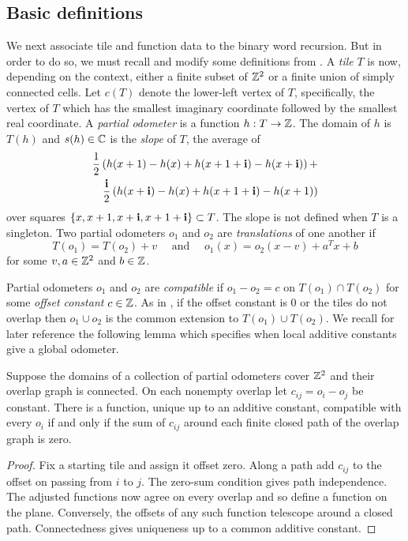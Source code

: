 \documentclass[12pt]{amsart}
\begin{document}
\subsection{Basic definitions} \label{subsec:basic_definitions}
We next associate tile and function data to the binary word recursion. But in order to do so, we must recall and modify
some definitions from \cite{levine2017apollonian}. A {\it tile} $T$ is now, depending on the context, either a finite subset of $\mathbb{Z}^2$ or a finite union of simply connected cells. Let $c(T)$ denote 
the lower-left vertex of $T$, specifically, the vertex of $T$ which has the smallest imaginary coordinate followed by the smallest real coordinate. A {\it partial odometer} is a function $h:T \to \mathbb{Z}$. The domain of $h$ is $T(h)$ and $s(h) \in \mathbb{C}$ is the {\it slope} of $T$,
the average of
\begin{equation}
\begin{aligned}
\frac 1 2 \left(h(x+1)-h(x)+h(x+1+\mathbf{i})-h(x+\mathbf{i})\right)+\\
\frac{\mathbf{i}}{2}\left(h(x+\mathbf{i})-h(x)+h(x+1+\mathbf{i})-h(x+1)\right)
\end{aligned}
\end{equation}
over squares $\{x, x+1, x + \mathbf{i}, x + 1 + \mathbf{i}\} \subset T$. The slope is not defined when $T$ is a singleton. Two partial odometers $o_{1}$ and $o_2$ are {\it translations} of one another if 
\begin{equation}
T(o_{1}) = T(o_2) + v \quad \mbox{ and } \quad o_{1}(x) = o_{2}(x-v) + a^T x + b 
\end{equation}
for some $v,a \in \mathbb{Z}^2$ and $b \in \mathbb{Z}$.  

Partial odometers $o_{1}$ and $o_2$ are {\it compatible} if 
$o_{1} - o_2 = c$ on $T(o_{1}) \cap T(o_2)$ for some {\it offset constant} $c \in \mathbb{Z}$.  As in \cite{levine2017apollonian}, if the offset constant is
0 or the tiles do not overlap then $o_{1} \cup o_2$ is the common extension to $T(o_{1}) \cup T(o_2)$. We recall for later reference the following lemma 
which specifies when local additive constants give a global odometer. 
\begin{lemma}\label{lemma:pairwise_compatibility}
Suppose the domains of a collection of partial odometers cover $\mathbb{Z}^2$ and their overlap graph is connected. On each nonempty overlap let $c_{ij}=o_i-o_j$ be constant. There is a function, unique up to an additive constant, compatible with every $o_i$ if and only if the sum of $c_{ij}$ around each finite closed path of the overlap graph is zero.
\end{lemma}
\begin{proof}
Fix a starting tile and assign it offset zero. Along a path add $c_{ij}$ to the offset on passing from $i$ to $j$. The zero-sum condition gives path independence. The adjusted functions now agree on every overlap and so define a function on the plane. Conversely, the offsets of any such function telescope around a closed path. Connectedness gives uniqueness up to a common additive constant.
\end{proof}
\end{document}
